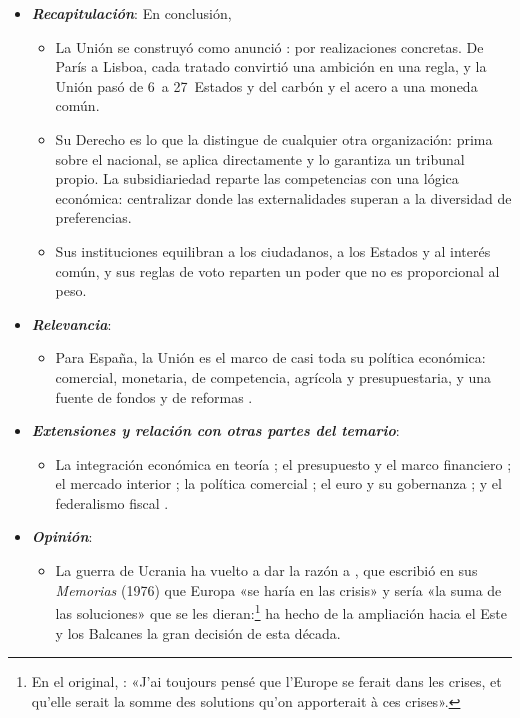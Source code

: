 \documentclass[11pt]{article}
\begin{document}
\begin{itemize}
\item \textbf{\emph{Recapitulación}}: En conclusión,
  \begin{itemize}
  \item La Unión se construyó como anunció : por realizaciones concretas. De París a Lisboa, cada tratado convirtió una ambición en una regla, y la Unión pasó de 6~a 27~Estados y del carbón y el acero a una moneda común.
  \item Su Derecho es lo que la distingue de cualquier otra organización: prima sobre el nacional, se aplica directamente y lo garantiza un tribunal propio. La subsidiariedad reparte las competencias con una lógica económica: centralizar donde las externalidades superan a la diversidad de preferencias.
  \item Sus instituciones equilibran a los ciudadanos, a los Estados y al interés común, y sus reglas de voto reparten un poder que no es proporcional al peso.
  \end{itemize}
\item \textbf{\emph{Relevancia}}:
  \begin{itemize}
  \item Para España, la Unión es el marco de casi toda su política económica: comercial, monetaria, de competencia, agrícola y presupuestaria, y una fuente de fondos y de reformas .
  \end{itemize}
\item \textbf{\emph{Extensiones y relación con otras partes del temario}}:
  \begin{itemize}
  \item La integración económica en teoría  ; el presupuesto y el marco financiero ; el mercado interior ; la política comercial ; el euro y su gobernanza  ; y el federalismo fiscal .
  \end{itemize}
\item \textbf{\emph{Opinión}}:
  \begin{itemize}
  \item La guerra de Ucrania ha vuelto a dar la razón a , que escribió en sus \emph{Memorias} (1976) que Europa «se haría en las crisis» y sería «la suma de las soluciones» que se les dieran:\footnote{En el original, \textcite{Monnet1976Memoires}: «J'ai toujours pensé que l'Europe se ferait dans les crises, et qu'elle serait la somme des solutions qu'on apporterait à ces crises».} ha hecho de la ampliación hacia el Este y los Balcanes la gran decisión de esta década.

\end{itemize}
\end{itemize}
\end{document}
